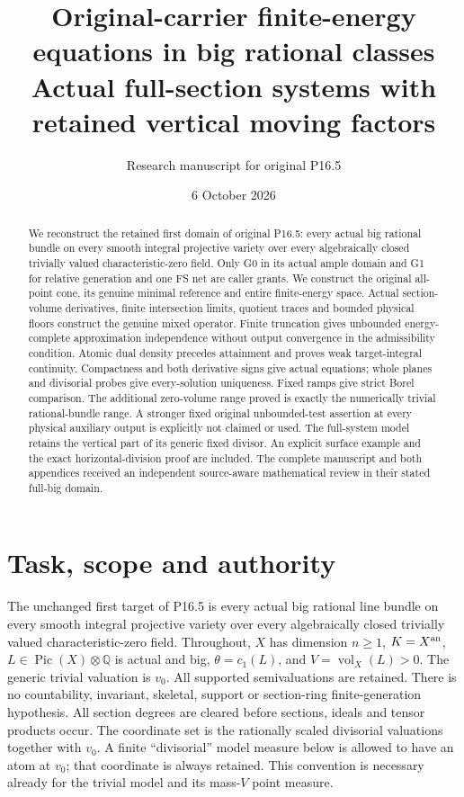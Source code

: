 \documentclass[10pt]{article}
\title{Original-carrier finite-energy equations in big rational classes\\
\large Actual full-section systems with retained vertical moving factors}
\author{Research manuscript for original P16.5}
\date{6 October 2026}
\newcommand{\vol}{\operatorname{vol}}
\begin{document}
\maketitle
\begin{abstract}
We reconstruct the retained first domain of original P16.5: every actual
big rational bundle on every smooth integral projective variety over every
algebraically closed trivially valued characteristic-zero field. Only G0 in
its actual ample domain and G1 for relative generation and one FS net are
caller grants. We construct the original all-point cone, its genuine minimal
reference and entire finite-energy space. Actual section-volume derivatives,
finite intersection limits, quotient traces and bounded physical floors
construct the genuine mixed operator. Finite truncation gives unbounded
energy-complete approximation independence without output convergence in
the admissibility condition. Atomic dual density precedes attainment and
proves weak target-integral continuity. Compactness and both derivative
signs give actual equations; whole planes and divisorial probes give
every-solution uniqueness. Fixed ramps give strict Borel comparison.
The additional zero-volume range proved is exactly the numerically trivial
rational-bundle range. A stronger fixed original unbounded-test assertion
at every physical auxiliary output is explicitly not claimed or used.
The full-system model retains the vertical part of its generic fixed divisor.
An explicit surface example and the exact horizontal-division proof are
included. The complete manuscript and both appendices received an independent
source-aware mathematical review in their stated full-big domain.
\end{abstract}

\section{Task, scope and authority}
The unchanged first target of P16.5 is every actual big rational line bundle
on every smooth integral projective variety over every algebraically closed
trivially valued characteristic-zero field. Throughout, $X$ has dimension
$n\geq1$, $K=X^{\rm an}$, $L\in\operatorname{Pic}(X)\otimes\mathbb Q$
is actual and big, $\theta=c_1(L)$, and $V=\vol_X(L)>0$.
The generic trivial valuation is $v_0$. All supported semivaluations are
retained. There is no countability, invariant, skeletal, support or
section-ring finite-generation hypothesis. All section degrees are cleared
before sections, ideals and tensor products occur.
The coordinate set is the rationally scaled divisorial valuations together
with $v_0$. A finite ``divisorial'' model measure below is allowed to have
an atom at $v_0$; that coordinate is always retained. This convention is
necessary already for the trivial model and its mass-$V$ point measure.
\end{document}
